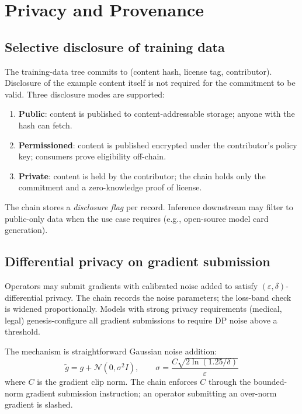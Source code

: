 \section{Privacy and Provenance}
\label{sec:privacy}

\subsection{Selective disclosure of training data}

The training-data tree commits to (content hash, license tag, contributor). Disclosure of the example content itself is not required for the commitment to be valid. Three disclosure modes are supported:

\begin{enumerate}[nosep]
\item \textbf{Public}: content is published to content-addressable storage; anyone with the hash can fetch.
\item \textbf{Permissioned}: content is published encrypted under the contributor's policy key; consumers prove eligibility off-chain.
\item \textbf{Private}: content is held by the contributor; the chain holds only the commitment and a zero-knowledge proof of license.
\end{enumerate}

The chain stores a \emph{disclosure flag} per record. Inference downstream may filter to public-only data when the use case requires (e.g., open-source model card generation).

\subsection{Differential privacy on gradient submission}

Operators may submit gradients with calibrated noise added to satisfy $(\varepsilon, \delta)$-differential privacy. The chain records the noise parameters; the loss-band check is widened proportionally. Models with strong privacy requirements (medical, legal) genesis-configure all gradient submissions to require DP noise above a threshold.

The mechanism is straightforward Gaussian noise addition:
\begin{equation}
\tilde{g} = g + \mathcal{N}(0, \sigma^2 I), \qquad \sigma = \frac{C \sqrt{2 \ln(1.25/\delta)}}{\varepsilon}
\end{equation}
where $C$ is the gradient clip norm. The chain enforces $C$ through the bounded-norm gradient submission instruction; an operator submitting an over-norm gradient is slashed.

